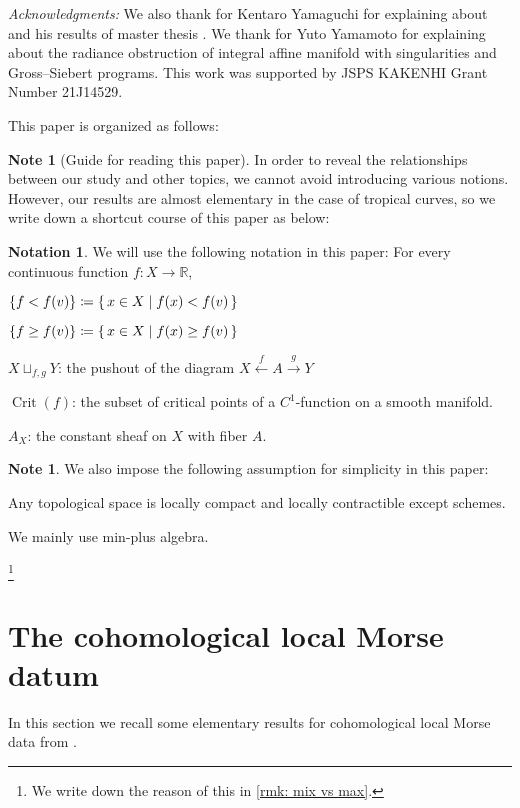 \documentclass[a4paper,dvipdfmx,reqno,12pt]{amsart}
\theoremstyle{definition}
\newtheorem{Note}[Thm]{Note}
\newtheorem{Not}[Thm]{Notation}
\newcommand{\deq}{\coloneqq}
\newcommand{\R}{\mathbb{R}}%
\newcommand{\opn}[1]{\operatorname{#1}}
\newcommand{\xto}[1]{\xrightarrow{#1}}
\newcommand{\xgets}[1]{\xleftarrow{#1}}
\numberwithin{equation}{section}
\begin{document}
\textit{Acknowledgments:}
We also thank for Kentaro Yamaguchi for explaining about
\cite{MR4234675} and his results of master thesis 
\cite{yamaguchimaster}. We thank for Yuto Yamamoto for
explaining about the radiance obstruction of integral 
affine manifold with singularities and Gross--Siebert
programs.
This work was supported by JSPS KAKENHI 
Grant Number 21J14529.

This paper is organized as follows:

\begin{Note}[Guide for reading this paper]
  In order to reveal the relationships between our study
  and other topics, we cannot avoid introducing various
  notions. However, our results are almost elementary
in the case of tropical curves,
  so we write down a shortcut course of this paper as below:
\end{Note}

\begin{Not}

  We will use the following notation in this paper:
  For every continuous function $f\colon X\to \R$,

  $\{f<f(v)\}\deq \set{x\in X\mid f(x)< f(v)}$

  $\{f\geq f(v)\}\deq \set{x\in X\mid f(x)\geq f(v)}$

  $X\sqcup_{f,g}Y$: the pushout of the diagram
  $X\xgets{f} A\xto{g} Y$

  $\opn{Crit}(f)$: the subset of critical points of a
  $C^{1}$-function on a smooth manifold.

$A_X$: the constant sheaf on $X$ with fiber $A$.
\end{Not}

\begin{Note}
  We also impose the following assumption for simplicity in this paper:

  Any topological space is locally compact and locally
  contractible except schemes.


  We mainly use min-plus algebra.

  \footnote{We write down the reason of this in \cref{rmk: mix vs max}.}


\end{Note}

\section{The cohomological local Morse datum}
In this section we recall some elementary results
for cohomological local Morse data from
\cite{MR2031639,MR1299726,MR4294126}.
\end{document}
